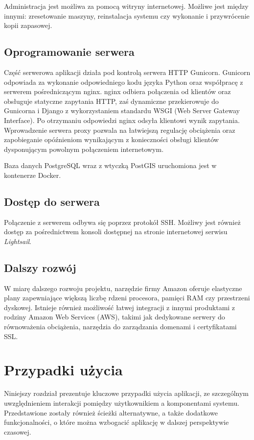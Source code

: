 \documentclass[licencjacka]{pracamgr}
\begin{document}
Administracja jest możliwa za pomocą witryny internetowej. Możliwe jest między innymi: zresetowanie maszyny, reinstalacja systemu czy wykonanie i przywrócenie kopii zapasowej.

\section{Oprogramowanie serwera}

Część serwerowa aplikacji działa pod kontrolą serwera HTTP Gunicorn. Gunicorn odpowiada za wykonanie odpowiedniego kodu języka Python oraz współpracę z serwerem pośredniczącym nginx. nginx odbiera połączenia od klientów oraz obsługuje statyczne zapytania HTTP, zaś dynamiczne przekierowuje do Gunicorna i Django z wykorzystaniem standardu WSGI (Web Server Gateway Interface). Po otrzymaniu odpowiedzi nginx odsyła klientowi wynik zapytania. Wprowadzenie serwera proxy pozwala na łatwiejszą regulację obciążenia oraz zapobieganie opóźnieniom wynikającym z konieczności obsługi klientów dysponującym powolnym połączeniem internetowym.

Baza danych PostgreSQL wraz z wtyczką PostGIS uruchomiona jest w kontenerze Docker.

\section{Dostęp do serwera}
Połączenie z serwerem odbywa się poprzez protokół SSH\@. Możliwy jest również dostęp za pośrednictwem konsoli dostępnej na stronie internetowej serwisu \textit{Lightsail}.

\section{Dalszy rozwój}
W miarę dalszego rozwoju projektu, narzędzie firmy Amazon oferuje elastyczne plany zapewniające większą liczbę rdzeni procesora, pamięci RAM czy przestrzeni dyskowej. Istnieje również możliwość łatwej integracji z innymi produktami z rodziny Amazon Web Services (AWS), takimi jak dedykowane serwery do równoważenia obciążenia, narzędzia do zarządzania domenami i certyfikatami SSL\@.


\chapter{Przypadki użycia}\label{r:usecase}
Niniejszy rozdział prezentuje kluczowe przypadki użycia aplikacji, ze szczególnym uwzględnieniem interakcji pomiędzy użytkownikiem a komponentami systemu. Przedstawione zostały również ścieżki alternatywne, a także dodatkowe funkcjonalności, o które można wzbogacić aplikację w dalszej perspektywie czasowej.
\end{document}
